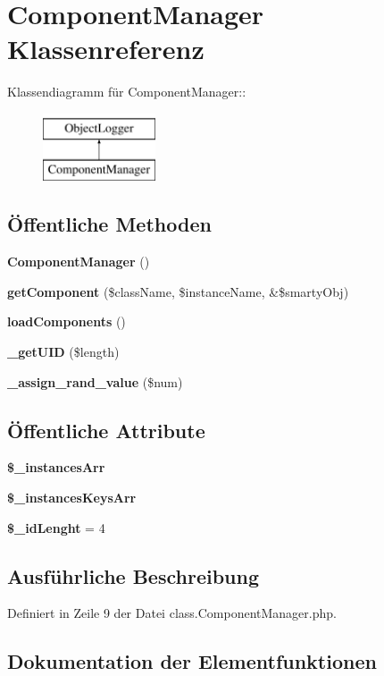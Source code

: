 \section{ComponentManager Klassenreferenz}
\label{classComponentManager}
Klassendiagramm für ComponentManager::\begin{figure}[H]
\begin{center}
\leavevmode
\includegraphics[height=2cm]{classComponentManager}
\end{center}
\end{figure}
\subsection*{Öffentliche Methoden}
\begin{CompactItemize}
\item 
{\bf ComponentManager} ()
\item 
{\bf getComponent} (\$className, \$instanceName, \&\$smartyObj)
\item 
{\bf loadComponents} ()
\item 
{\bf \_\-getUID} (\$length)
\item 
{\bf \_\-assign\_\-rand\_\-value} (\$num)
\end{CompactItemize}
\subsection*{Öffentliche Attribute}
\begin{CompactItemize}
\item 
{\bf \$\_\-instancesArr}
\item 
{\bf \$\_\-instancesKeysArr}
\item 
{\bf \$\_\-idLenght} = 4
\end{CompactItemize}


\subsection{Ausführliche Beschreibung}


Definiert in Zeile 9 der Datei class.ComponentManager.php.

\subsection{Dokumentation der Elementfunktionen}
